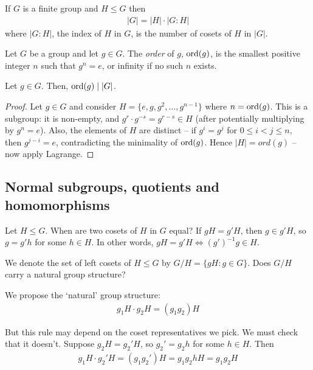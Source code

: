 \documentclass{../../template/note}
\begin{document}
    \begin{theorem}[Lagrange]
        If $G$ is a finite group and $H \leq G$ then
        \begin{align*}
            |G| = |H| \cdot |G:H|
        \end{align*}
        where $|G:H|$, the index of $H$ in $G$, is the number of cosets of $H$ in $|G|$.
    \end{theorem}
    
    \begin{definition}
        Let $G$ be a group and let $g \in G$. The \emph{order} of $g$, $\operatorname{ord}(g)$, is the smallest positive integer $n$ such that $g^n = e$, or infinity if no such $n$ exists.
    \end{definition}
    
    \begin{proposition}
        Let $g \in G$. Then, $\operatorname{ord}(g) \mid |G|$.
    \end{proposition}
    
    \begin{proof}
        Let $g \in G$ and consider $H = \{e, g, g^2, \dots, g^{n-1}\}$ where $n = \operatorname{ord}(g)$. This is a subgroup: it is non-empty, and $g^r \cdot g^{-s} = g^{r-s} \in H$ (after potentially multiplying by $g^n = e$). Also, the elements of $H$ are distinct -- if $g^i = g^j$ for $0 \leq i < j \leq n$, then $g^{j-i} = e$, contradicting the minimality of $\operatorname{ord}(g)$. Hence $|H| = ord(g)$ -- now apply Lagrange.
    \end{proof}
    
    \subsection{Normal subgroups, quotients and homomorphisms}

    Let $H \leq G$. When are two cosets of $H$ in $G$ equal? If $gH = g'H$, then $g \in g'H$, so $g = g'h$ for some $h \in H$. In other words, $gH = g'H \iff (g')^{-1}g \in H$.

    We denote the set of left cosets of $H \leq G$ by $G/H = \{gH: g \in G\}$. Does $G/H$ carry a natural group structure?


    We propose the `natural' group structure:
    \begin{align*}
        g_1H \cdot g_2H = (g_1g_2)H
    \end{align*}
    
    But this rule may depend on the coset representatives we pick. We must check that it doesn't. Suppose $g_2H = g_2'H$, so $g_2' = g_2h$ for some $h \in H$. Then
    \begin{align*}
        g_1H \cdot g_2'H = (g_1g_2')H = g_1g_2hH = g_1g_2H
    \end{align*}
    
\end{document}
